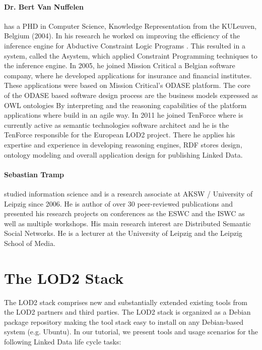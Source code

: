 \documentclass[a4paper, 11pt]{llncs}
\begin{document}
\paragraph{Dr. Bert Van Nuffelen} has a PHD in Computer Science, Knowledge Representation from the KULeuven, Belgium (2004).
In his research he worked on improving the efficiency of the inference engine for Abductive Constraint Logic Programs \cite{bertvn}.
This resulted in a system, called the Asystem, which applied Constraint Programming techniques to the
inference engine.
In 2005, he joined Mission Critical a Belgian software company, where he developed applications for insurance and financial institutes.
These applications were based on Mission Critical's ODASE platform.
The core of the ODASE based software design process are the business models expressed as OWL ontologies
By interpreting and the reasoning capabilities of the platform applications where build in an agile way.
In 2011 he joined TenForce where is currently active as semantic technologies software architect and he is the TenForce responsible for the European LOD2 project.
There he applies his expertise and experience in developing reasoning engines, RDF stores design, ontology modeling and overall application design for publishing Linked Data.

\paragraph{Sebastian Tramp} studied information science and is a research associate at AKSW / University of Leipzig since 2006.
He is author of over 30 peer-reviewed publications and presented his research projects on conferences as the ESWC and the ISWC as well as multiple workshops.
His main research interest are Distributed Semantic Social Networks.
He is a lecturer at the University of Leipzig and the Leipzig School of Media.


\section{The LOD2 Stack}
\label{sec:stack}

The LOD2 stack comprises new and substantially extended existing tools from the LOD2 partners and third parties.
The LOD2 stack is organized as a Debian package repository making the tool stack easy to install on any Debian-based system (e.g. Ubuntu).
In our tutorial, we present tools and usage scenarios for the following Linked Data life cycle tasks:
\end{document}
